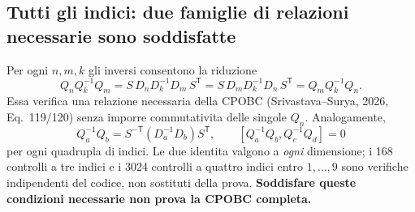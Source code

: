 \documentclass[11pt,a4paper]{article}
\begin{document}
\subsection*{Tutti gli indici: due famiglie di relazioni necessarie sono soddisfatte}
Per ogni $n,m,k$ gli inversi consentono la riduzione
\begin{equation}
Q_nQ_k^{-1}Q_m
 =S\,D_nD_k^{-1}D_m\,S^{\mathsf T}
 =S\,D_mD_k^{-1}D_n\,S^{\mathsf T}
 =Q_mQ_k^{-1}Q_n.\tag{AC.4}
\end{equation}
Essa verifica una relazione necessaria della CPOBC (Srivastava--Surya, 2026, Eq.~119/120) senza imporre commutativita delle singole $Q_n$. Analogamente,
\begin{equation}
Q_a^{-1}Q_b=S^{-\mathsf T}(D_a^{-1}D_b)S^{\mathsf T},\qquad
\boxed{[Q_a^{-1}Q_b,Q_c^{-1}Q_d]=0}\tag{AC.5}
\end{equation}
per ogni quadrupla di indici. Le due identita valgono a \emph{ogni} dimensione; i 168 controlli a tre indici e i 3024 controlli a quattro indici entro $1,\ldots,9$ sono verifiche indipendenti del codice, non sostituti della prova. \textbf{Soddisfare queste condizioni necessarie non prova la CPOBC completa.}

\clearpage
\end{document}
